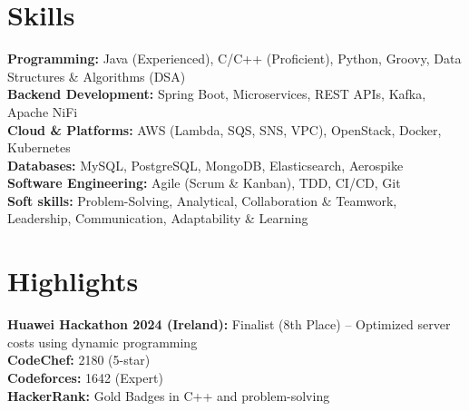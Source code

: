 \documentclass[]{resumebb}
\begin{document}


\section{\Large Skills}
\vspace{3pt}
\textbf{Programming:} Java (Experienced), C/C++ (Proficient), Python, Groovy, Data Structures \& Algorithms (DSA) \\
\vspace{3pt}
\textbf{Backend Development:} Spring Boot, Microservices, REST APIs, Kafka, Apache NiFi \\
\vspace{3pt}
\textbf{Cloud \& Platforms:} AWS (Lambda, SQS, SNS, VPC), OpenStack, Docker, Kubernetes \\
\vspace{3pt}
\textbf{Databases:} MySQL, PostgreSQL, MongoDB, Elasticsearch, Aerospike \\
\vspace{3pt}
\textbf{Software Engineering:} Agile (Scrum \& Kanban), TDD, CI/CD, Git \\
\vspace{3pt}
\textbf{Soft skills:} Problem-Solving, Analytical, Collaboration \& Teamwork, Leadership, Communication, Adaptability \& Learning \\


\section{\Large Highlights}
\vspace{3pt}
\textbf{Huawei Hackathon 2024 (Ireland):} Finalist (8th Place) – Optimized server costs using dynamic programming \\
\vspace{3pt}
\textbf{CodeChef:} 2180 (5-star) \\
\vspace{3pt}
\textbf{Codeforces:} 1642 (Expert) \\
\vspace{3pt}
\textbf{HackerRank:} Gold Badges in C++ and problem-solving \\
\end{document}
